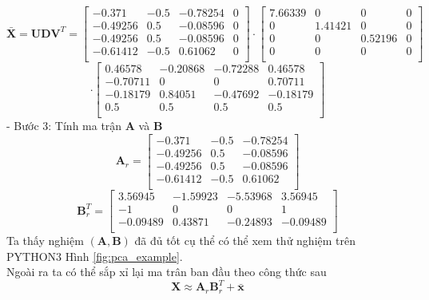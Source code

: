 \documentclass[12pt,a4paper,oneside]{report}
\numberwithin{equation}{section}
\begin{document}
\[
\bar{\mathbf{X}}=\mathbf{UDV}^{T} = \begin{bmatrix}
-0.371 & -0.5 & -0.78254 & 0 \\
-0.49256 & 0.5 & -0.08596 & 0 \\
-0.49256 & 0.5 & -0.08596 & 0 \\
-0.61412 & -0.5 & 0.61062 & 0 \\
\end{bmatrix} \cdot \begin{bmatrix}
7.66339 & 0 & 0 & 0 \\
0 & 1.41421 & 0 & 0 \\
0 & 0 & 0.52196 & 0 \\
0 & 0 & 0 & 0 \\
\end{bmatrix}
\]
\[
\cdot \begin{bmatrix}
0.46578 & -0.20868 & -0.72288 & 0.46578 \\
-0.70711 & 0 & 0 & 0.70711 \\
-0.18179 & 0.84051 & -0.47692 & -0.18179 \\
0.5 & 0.5 & 0.5 & 0.5 \\
\end{bmatrix}
\]
- Bước 3: Tính ma trận $\mathbf{A}$ và $\mathbf{B}$
\begin{equation}
	\mathbf{A}_r = \begin{bmatrix}
	-0.371 & -0.5 & -0.78254  \\
	-0.49256 & 0.5 & -0.08596 \\
	-0.49256 & 0.5 & -0.08596  \\
	-0.61412 & -0.5 & 0.61062 \\
\end{bmatrix}
\end{equation}
\begin{equation}
	\mathbf{B}_r^{T} =\begin{bmatrix}
3.56945 & -1.59923 & -5.53968 & 3.56945 \\
-1 & 0 & 0 & 1 \\
-0.09489 & 0.43871 & -0.24893 & -0.09489 \\
	\end{bmatrix}
\end{equation}
Ta thấy nghiệm $(\mathbf{A, B})$ đã đủ tốt cụ thể có thể xem thử nghiệm trên PYTHON3 Hình \ref{fig:pca_example}.\\
Ngoài ra ta có thể sắp xỉ lại ma trân ban đầu theo công thức sau 
\begin{equation} 
	\mathbf{X} \approx \mathbf{A}_r\mathbf{B}_r^{T}+ \bar{\mathbf{x}} 
\end{equation} 
\end{document}
